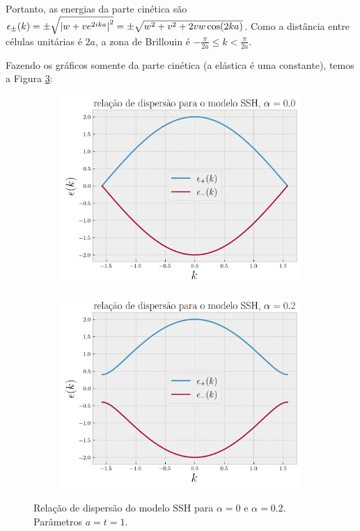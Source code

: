 \documentclass[a4paper,10pt]{article}
\begin{document}
Portanto, as energias da parte cinética são $\epsilon_\pm(k) = \pm \sqrt{\abs{w + v e^{2ika}}^2} = \pm \sqrt{w^2 + v^2 + 2 vw \cos(2ka)}$. Como a distância entre células unitárias é $2a$, a zona de Brillouin é $-\frac{\pi}{2a} \leq k < \frac{\pi}{2a}$.

Fazendo os gráficos somente da parte cinética (a elástica é uma constante), temos a Figura \ref{fig:eps-ssh}:
\begin{figure}[H]
\centering
\begin{subfigure}{.45\textwidth}
  \centering
  \includegraphics[width=\linewidth]{fig/eps_ssh_alpha0.png}
  \label{fig:ssh-alpha0}
\end{subfigure}
\begin{subfigure}{.45\textwidth}
  \centering
  \includegraphics[width=\linewidth]{fig/eps_ssh_alphanot0.png}
  \label{fig:ssh-alphanot0}
\end{subfigure}
\caption{Relação de dispersão do modelo SSH para $\alpha = 0$ e $\alpha = 0.2$. Parâmetros $a = t = 1$.}
\label{fig:eps-ssh}
\end{figure}
\end{document}
